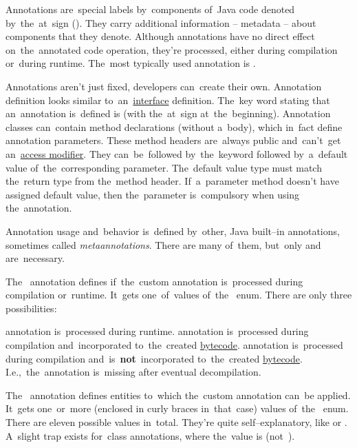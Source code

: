 \label{javaannotation}
Annotations are~special labels by~components of~Java code denoted by~the~at~sign ().
They carry additional information -- metadata -- about components that they denote.
Although annotations have no direct effect on~the~annotated code operation, they're processed, either during compilation or~during runtime.
The~most typically used annotation is \hyperref[javaoverride]{}.

\label{javacustomannotations}
Annotations aren't just fixed, developers can~create their own.
Annotation definition looks similar to~an~\hyperref[javainterface]{interface} definition.
The~key word stating that an~annotation is~defined is  (with the~at~sign at~the~beginning).
Annotation classes can~contain method declarations (without a~body), which in~fact define annotation parameters.
These method headers are~always public and~can't~get an~\hyperref[javaaccessmodifiers]{access modifier}.
They can~be~followed by~the~keyword  followed by~a~default value of~the~corresponding parameter.
The~default value type must match the~return type from the~method header.
If~a~parameter method doesn't have assigned default value, then the~parameter is~compulsory when using the~annotation.

Annotation usage and~behavior is~defined by~other, Java built--in annotations, sometimes called \textit{metaannotations}.
There are many of~them, but~only  and~ are~necessary.

The~ annotation defines if~the~custom annotation is~processed during compilation or~runtime.
It~gets one~of~values of~the~ enum.
There are only three possibilities:
\begin{itemize}
     annotation is~processed during runtime.
     annotation is~processed during compilation and~incorporated to~the~created \hyperref[javabytecode]{bytecode}.
     annotation is~processed during compilation and~is~\textbf{not}~incorporated to~the~created \hyperref[javabytecode]{bytecode}.
             I.e.,~the~annotation is~missing after eventual decompilation.
\end{itemize}

\noindent The~ annotation defines entities to~which the~custom annotation can~be applied.
It~gets one~or~more (enclosed in curly braces in~that~case) values of~the~ enum.
There are eleven possible values in~total.
They're quite self--explanatory, like  or .
A~slight trap exists for~class annotations, where the~value is  \mbox{(not )}.

